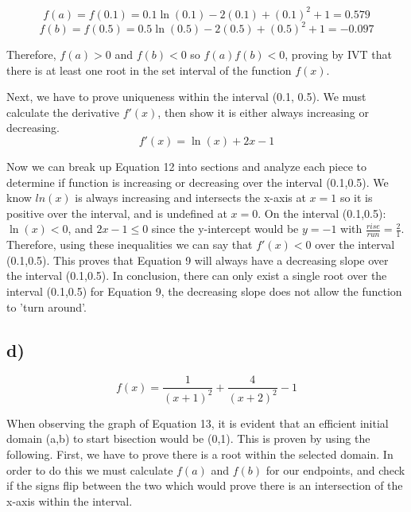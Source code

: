 \documentclass{article}
\begin{document}
    \begin{equation}
         f(a) = f(0.1) = 0.1\ln(0.1)-2(0.1)+(0.1)^2+1 = 0.579 
    \end{equation}
    \begin{equation}
         f(b) = f(0.5) = 0.5\ln(0.5)-2(0.5)+(0.5)^2+1 = -0.097 
    \end{equation}

    Therefore, $f(a) > 0$ and $f(b) < 0$ so $f(a)f(b) < 0$, proving by IVT that there is at least one root in the set interval of the function $f(x)$.  

     Next, we have to prove uniqueness within the interval (0.1, 0.5).  We must calculate the derivative $f'(x)$, then show it is either always increasing or decreasing.
     \begin{equation}
         f'(x) = \ln(x)+2x-1
     \end{equation}

    Now we can break up Equation 12 into sections and analyze each piece to determine if function is increasing or decreasing over the interval (0.1,0.5).  We know $ln(x)$ is always increasing and intersects the x-axis at $x=1$ so it is positive over the interval, and is undefined at $x=0$.  On the interval (0.1,0.5): $\ln(x) < 0$, and $2x-1 \le 0$ since the y-intercept would be $y=-1$ with $\frac{rise}{run} = \frac{2}{1}$.  Therefore, using these inequalities we can say that $f'(x) < 0$ over the interval (0.1,0.5).  This proves that Equation 9 will always have a decreasing slope over the interval (0.1,0.5).  In conclusion, there can only exist a single root over the interval (0.1,0.5) for Equation 9, the decreasing slope does not allow the function to 'turn around'.

\subsection*{d)}
    \begin{equation}
         f(x) = \frac{1}{(x+1)^2} + \frac{4}{(x+2)^2} -1
    \end{equation}

    When observing the graph of Equation 13, it is evident that an efficient initial domain (a,b) to start bisection would be (0,1).  This is proven by using the following.  First, we have to prove there is a root within the selected domain.  In order to do this we must calculate $f(a)$ and $f(b)$ for our endpoints, and check if the signs flip between the two which would prove there is an intersection of the x-axis within the interval.
\end{document}
